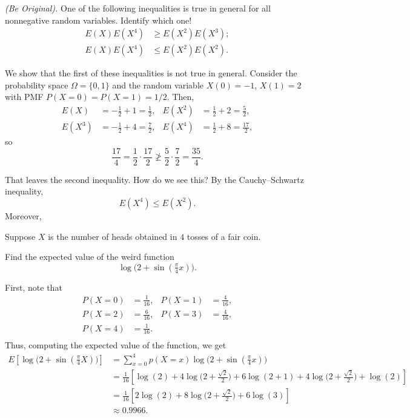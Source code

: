 \begin{problem}[Handout 7, \# 14]
  \emph{(Be Original).} One of the following inequalities is true in
  general for all nonnegative random variables. Identify which one!
  \begin{align*}
    E(X)E(X^4)&\geq E(X^2)E(X^3);\\
    E(X)E(X^4)&\leq E(X^2)E(X^2).
  \end{align*}
\end{problem}
\begin{solution}
  We show that the first of these inequalities is not true in
  general. Consider the probability space \(\Omega=\{0,1\}\) and the random
  variable \(X(0)=-1\), \(X(1)=2\) with PMF \(P(X=0)=P(X=1)=1/2\). Then,
  \begin{align*}
    E(X)&=-\frac{1}{2}+1=\frac{1}{2},&
    E(X^2)&=\frac{1}{2}+2=\frac{5}{2},\\
    E(X^3)&=-\frac{1}{2}+4=\frac{7}{2},&
    E(X^4)&=\frac{1}{2}+8=\frac{17}{2},
  \end{align*}
  so
  \[
    \frac{17}{4}=\frac{1}{2}\cdot\frac{17}{2}\ngeq
    \frac{5}{2}\cdot\frac{7}{2}=\frac{35}{4}.
  \]

  That leaves the second inequality. How do we see this? By the
  Cauchy--Schwartz inequality,
  \[
    E(X^4)\leq E(X^2).
  \]
  Moreover,
\end{solution}
\newpage

\begin{problem}[Handout 7, \# 15]
  Suppose \(X\) is the number of heads obtained in \(4\) tosses of a fair
  coin.

  Find the expected value of the weird function
  \[
    \log\bigl( 2+\sin(\tfrac{\pi}{4}x) \bigr).
  \]
\end{problem}
\begin{solution}
  First, note that
  \begin{align*}
    P(X=0) &= \frac{1}{16},&
    P(X=1) &= \frac{4}{16},\\
    P(X=2) &= \frac{6}{16},&
    P(X=3) &= \frac{4}{16},\\
    P(X=4) &= \frac{1}{16}.\\
  \end{align*}
  Thus, computing the expected value of the function, we get
  \begin{align*}
    E\left[\log\bigl( 2+\sin(\tfrac{\pi}{4}X) \bigr)\right]
    &= \sum_{x=0}^4 p(X=x)\log\bigl( 2+\sin(\tfrac{\pi}{4}x) \bigr)\\
    &= \frac{1}{16} \left[\log(2) +4 \log \bigl(2+\tfrac{\sqrt{2}}{2}
      \bigr) +6 \log (2+1) +4 \log \bigl(2+\tfrac{\sqrt{2}}{2}
      \bigr) + \log(2)\right]\\
    &=\frac{1}{16} \left[2\log(2) +8 \log \bigl(2+\tfrac{\sqrt{2}}{2}
      \bigr) +6 \log (3) \right]\\
    &\approx 0.9966.
  \end{align*}
\end{solution}
\newpage


